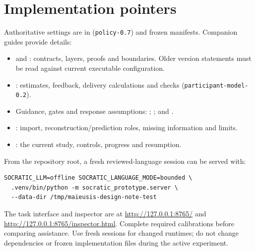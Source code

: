 \documentclass[11pt,a4paper]{article}
\begin{document}
\section*{Implementation pointers}
Authoritative settings are in  (\texttt{policy-0.7}) and frozen manifests. Companion guides provide details:
\begin{itemize}
\item {} and : contracts, layers, proofs and boundaries. Older version statements must be read against current executable configuration.
\item {}: estimates, feedback, delivery calculations and checks (\texttt{participant-model-0.2}).
\item Guidance, gates and response assumptions: ;\newline
{}; and\newline
{}.
\item {}: import, reconstruction/prediction roles, missing information and limits.
\item {}: the current study, controls, progress and resumption.
\end{itemize}
From the repository root, a fresh reviewed-language session can be served with:
\begin{lstlisting}
SOCRATIC_LLM=offline SOCRATIC_LANGUAGE_MODE=bounded \
  .venv/bin/python -m socratic_prototype.server \
  --data-dir /tmp/maieusis-design-note-test
\end{lstlisting}
The task interface and inspector are at \url{http://127.0.0.1:8765/} and \url{http://127.0.0.1:8765/inspector.html}. Complete required calibrations before comparing assistance. Use fresh sessions for changed runtimes; do not change dependencies or frozen implementation files during the active experiment.
\end{document}

